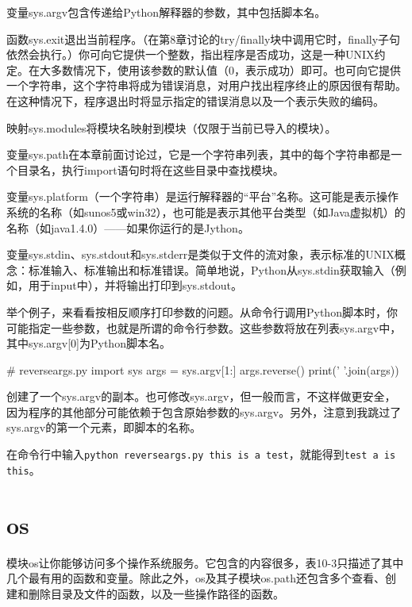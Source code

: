 变量sys.argv包含传递给Python解释器的参数，其中包括脚本名。

函数sys.exit退出当前程序。（在第8章讨论的try/finally块中调用它时，finally子句依然会执行。）你可向它提供一个整数，指出程序是否成功，这是一种UNIX约定。在大多数情况下，使用该参数的默认值（0，表示成功）即可。也可向它提供一个字符串，这个字符串将成为错误消息，对用户找出程序终止的原因很有帮助。在这种情况下，程序退出时将显示指定的错误消息以及一个表示失败的编码。

映射sys.modules将模块名映射到模块（仅限于当前已导入的模块）。

变量sys.path在本章前面讨论过，它是一个字符串列表，其中的每个字符串都是一个目录名，执行import语句时将在这些目录中查找模块。

变量sys.platform（一个字符串）是运行解释器的“平台”名称。这可能是表示操作系统的名称（如sunos5或win32），也可能是表示其他平台类型（如Java虚拟机）的名称（如java1.4.0）——如果你运行的是Jython。

变量sys.stdin、sys.stdout和sys.stderr是类似于文件的流对象，表示标准的UNIX概念：标准输入、标准输出和标准错误。简单地说，Python从sys.stdin获取输入（例如，用于input中），并将输出打印到sys.stdout。

举个例子，来看看按相反顺序打印参数的问题。从命令行调用Python脚本时，你可能指定一些参数，也就是所谓的命令行参数。这些参数将放在列表sys.argv中，其中sys.argv[0]为Python脚本名。
\begin{pyc}
# reverseargs.py
import sys
args = sys.argv[1:]
args.reverse()
print(' '.join(args))
\end{pyc}
创建了一个sys.argv的副本。也可修改sys.argv，但一般而言，不这样做更安全，因为程序的其他部分可能依赖于包含原始参数的sys.argv。另外，注意到我跳过了sys.argv的第一个元素，即脚本的名称。

在命令行中输入\verb|python reverseargs.py this is a test|，就能得到\verb|test a is this|。

\section{os}
模块os让你能够访问多个操作系统服务。它包含的内容很多，表10-3只描述了其中几个最有用的函数和变量。除此之外，os及其子模块os.path还包含多个查看、创建和删除目录及文件的函数，以及一些操作路径的函数。


